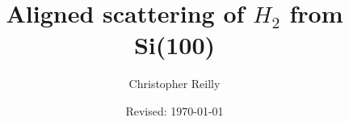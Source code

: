 \author{Christopher Reilly} 
\title{Aligned scattering of $H_2$ from Si(100)} 
\date{Revised: \today}